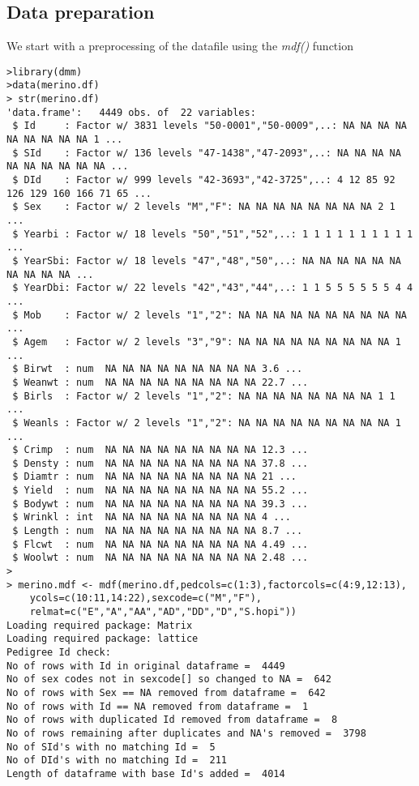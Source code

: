 \documentclass[titlepage]{article}  %
\begin{document}
\subsection{Data preparation}
We start with a  preprocessing of the datafile using the {\em mdf()} function

\begin{verbatim}
>library(dmm)
>data(merino.df)
> str(merino.df)
'data.frame':	4449 obs. of  22 variables:
 $ Id     : Factor w/ 3831 levels "50-0001","50-0009",..: NA NA NA NA NA NA NA NA NA 1 ...
 $ SId    : Factor w/ 136 levels "47-1438","47-2093",..: NA NA NA NA NA NA NA NA NA NA ...
 $ DId    : Factor w/ 999 levels "42-3693","42-3725",..: 4 12 85 92 126 129 160 166 71 65 ...
 $ Sex    : Factor w/ 2 levels "M","F": NA NA NA NA NA NA NA NA 2 1 ...
 $ Yearbi : Factor w/ 18 levels "50","51","52",..: 1 1 1 1 1 1 1 1 1 1 ...
 $ YearSbi: Factor w/ 18 levels "47","48","50",..: NA NA NA NA NA NA NA NA NA NA ...
 $ YearDbi: Factor w/ 22 levels "42","43","44",..: 1 1 5 5 5 5 5 5 4 4 ...
 $ Mob    : Factor w/ 2 levels "1","2": NA NA NA NA NA NA NA NA NA NA ...
 $ Agem   : Factor w/ 2 levels "3","9": NA NA NA NA NA NA NA NA NA 1 ...
 $ Birwt  : num  NA NA NA NA NA NA NA NA NA 3.6 ...
 $ Weanwt : num  NA NA NA NA NA NA NA NA NA 22.7 ...
 $ Birls  : Factor w/ 2 levels "1","2": NA NA NA NA NA NA NA NA 1 1 ...
 $ Weanls : Factor w/ 2 levels "1","2": NA NA NA NA NA NA NA NA NA 1 ...
 $ Crimp  : num  NA NA NA NA NA NA NA NA NA 12.3 ...
 $ Densty : num  NA NA NA NA NA NA NA NA NA 37.8 ...
 $ Diamtr : num  NA NA NA NA NA NA NA NA NA 21 ...
 $ Yield  : num  NA NA NA NA NA NA NA NA NA 55.2 ...
 $ Bodywt : num  NA NA NA NA NA NA NA NA NA 39.3 ...
 $ Wrinkl : int  NA NA NA NA NA NA NA NA NA 4 ...
 $ Length : num  NA NA NA NA NA NA NA NA NA 8.7 ...
 $ Flcwt  : num  NA NA NA NA NA NA NA NA NA 4.49 ...
 $ Woolwt : num  NA NA NA NA NA NA NA NA NA 2.48 ...
> 
> merino.mdf <- mdf(merino.df,pedcols=c(1:3),factorcols=c(4:9,12:13),
    ycols=c(10:11,14:22),sexcode=c("M","F"),
    relmat=c("E","A","AA","AD","DD","D","S.hopi"))
Loading required package: Matrix
Loading required package: lattice
Pedigree Id check:
No of rows with Id in original dataframe =  4449 
No of sex codes not in sexcode[] so changed to NA =  642 
No of rows with Sex == NA removed from dataframe =  642 
No of rows with Id == NA removed from dataframe =  1 
No of rows with duplicated Id removed from dataframe =  8 
No of rows remaining after duplicates and NA's removed =  3798 
No of SId's with no matching Id =  5 
No of DId's with no matching Id =  211 
Length of dataframe with base Id's added =  4014 

\end{verbatim}
\end{document}
